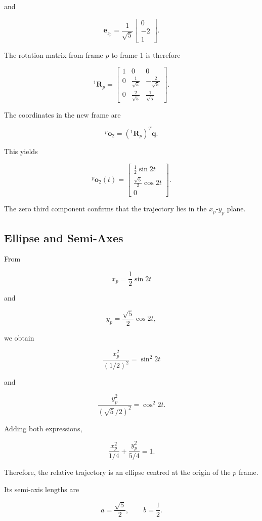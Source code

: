 \documentclass[11pt,a4paper]{article}
\begin{document}
and

\[
\bm{e}_{z_p}
=
\frac{1}{\sqrt{5}}
\begin{bmatrix}
0\\-2\\1
\end{bmatrix}.
\]

The rotation matrix from frame $p$ to frame 1 is therefore

\[
{}^{1}\bm{R}_{p}
=
\begin{bmatrix}
1 & 0 & 0\\
0 & \frac{1}{\sqrt{5}} & -\frac{2}{\sqrt{5}}\\
0 & \frac{2}{\sqrt{5}} & \frac{1}{\sqrt{5}}
\end{bmatrix}.
\]

The coordinates in the new frame are

\[
{}^{p}\bm{o}_2
=
({}^{1}\bm{R}_{p})^T
\bm{q}.
\]

This yields

\[
\boxed{
{}^{p}\bm{o}_2(t)
=
\begin{bmatrix}
\frac{1}{2}\sin 2t\\
\frac{\sqrt{5}}{2}\cos 2t\\
0
\end{bmatrix}
}.
\]

The zero third component confirms that the trajectory lies in the
$x_p$-$y_p$ plane.

\subsection{Ellipse and Semi-Axes}

From

\[
x_p = \frac{1}{2}\sin 2t
\]

and

\[
y_p = \frac{\sqrt{5}}{2}\cos 2t,
\]

we obtain

\[
\frac{x_p^2}{(1/2)^2}
=
\sin^2 2t
\]

and

\[
\frac{y_p^2}{(\sqrt{5}/2)^2}
=
\cos^2 2t.
\]

Adding both expressions,

\[
\boxed{
\frac{x_p^2}{1/4}
+
\frac{y_p^2}{5/4}
=
1
}.
\]

Therefore, the relative trajectory is an ellipse centred at the origin
of the $p$ frame.

Its semi-axis lengths are

\[
\boxed{
a = \frac{\sqrt{5}}{2},
\qquad
b = \frac{1}{2}
}.
\]
\end{document}
